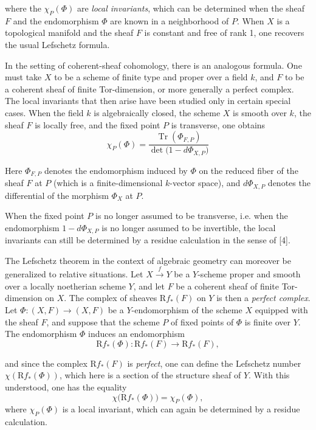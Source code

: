 %
where the $\chi_P(\Phi)$ are \emph{local invariants}, which can be determined
when the sheaf $F$ and the endomorphism $\Phi$ are known in a neighborhood
of $P$. When $X$ is a topological manifold and the sheaf $F$ is constant
and free of rank 1, one recovers the usual Lefschetz formula.

In the setting of coherent-sheaf cohomology, there is an analogous formula.
One must take $X$ to be a scheme of finite type and proper over a field $k$,
and $F$ to be a coherent sheaf of finite Tor-dimension, or more generally a
perfect complex. The local invariants that then arise have been studied only
in certain special cases. When the field $k$ is algebraically closed, the
scheme $X$ is smooth over $k$, the sheaf $F$ is locally free, and the fixed
point $P$ is transverse, one obtains
\[
\chi_P(\Phi)
=\frac{\operatorname{Tr}(\Phi_{F,P})}
       {\det\bigl(1-d\Phi_{X,P}\bigr)}
\]

Here $\Phi_{F,P}$ denotes the endomorphism induced by $\Phi$ on the reduced
fiber of the sheaf $F$ at $P$ (which is a finite-dimensional $k$-vector
space), and $d\Phi_{X,P}$ denotes the differential of the morphism $\Phi_X$
at $P$.

When the fixed point $P$ is no longer assumed to be transverse, i.e. when
the endomorphism $1-d\Phi_{X,P}$ is no longer assumed to be invertible, the
local invariants can still be determined by a residue calculation in the
sense of [4].

The Lefschetz theorem in the context of algebraic geometry can moreover be
generalized to relative situations.
Let $X\xrightarrow{f}Y$ be a $Y$-scheme proper and smooth over a locally
noetherian scheme $Y$, and let $F$ be a coherent sheaf of finite
Tor-dimension on $X$. The complex of sheaves $\mathrm{R}f_*(F)$ on $Y$ is
then a \emph{perfect complex}. Let
$\Phi\colon(X,F)\longrightarrow(X,F)$ be a $Y$-endomorphism of the scheme
$X$ equipped with the sheaf $F$, and suppose that the scheme $P$ of fixed
points of $\Phi$ is finite over $Y$. The endomorphism $\Phi$ induces an
endomorphism
\[
\mathrm{R}f_*(\Phi)\colon
\mathrm{R}f_*(F)\longrightarrow\mathrm{R}f_*(F),
\]

and since the complex $\mathrm{R}f_*(F)$ is \emph{perfect}, one can define
the Lefschetz number $\chi(\mathrm{R}f_*(\Phi))$, which here is a section of
the structure sheaf of $Y$. With this understood, one has the equality
\[
\chi\bigl(\mathrm{R}f_*(\Phi)\bigr)=\chi_P(\Phi),
\]
where $\chi_P(\Phi)$ is a local invariant, which can again be determined by
a residue calculation.


